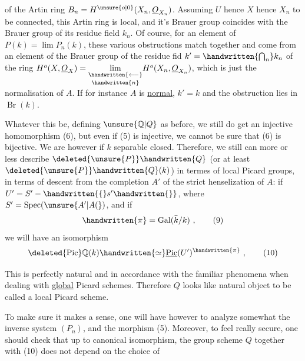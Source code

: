 of the Artin ring $B_n=H^{\unsure{o|0}}(X_n,\underline{O}_{X_n})$. Assuming $U$ hence $X$ hence $X_n$ to be connected, this Artin ring is local, and it's Brauer group coincides with the Brauer group of its residue field $k_n$. Of course,  for an element of $P(k)=\lim P_n(k)$, these various obstructions match together and come from an element of the Brauer group of the residue fid $k'=\handwritten{\bigcap_n}k_n$ of the ring $H^o(X,\underline{O}_X)=\underset{\handwritten{n}}{\underset{\handwritten{\longleftarrow}}{\lim}}H^o(X_n,\underline{O}_{X_n})$,  which is just the normalisation of $A$. If for instance $A$ is \uline{normal},  $k'=k$ and the obstruction lies in $\operatorname{Br}(k)$.

Whatever this be, defining $\unsure{\mathbb{Q}|Q}$ as before, we still do get an injective homomorphism (6), but even if (5) is injective, we cannot be sure that (6) is bijective. We are however if $k$  separable closed. Therefore, we still  can more or less describe $\deleted{\unsure{P}}\handwritten{Q}$ (or at least $\deleted{\unsure{P}}\handwritten{Q}(k)$) in termes of local Picard groups, in terms of  descent from the completion $A'$ of the strict henselization of $A$: if $U'=S'-\handwritten{\{}s'\handwritten{\}}$, where $S'=\operatorname{Spec}(\unsure{A'|A(})$, and if
\[
\handwritten{\pi}=\operatorname{Gal}(\bar{k}/k)\ ,
\tag*{(9)}
\]
we will have an isomorphism
\[
\deleted{\operatorname{Pic}}\mathbb{Q}(k)\handwritten{\simeq}\underline{\operatorname{Pic}}(U')^{\handwritten{\pi}}\ ,
\tag*{(10)}
\]

This is perfectly natural and in accordance with the familiar phenomena when dealing with \uline{global} Picard schemes. Therefore $Q$ looks like  natural object to be called a  local Picard scheme.

To make sure it makes a sense, one will have however to analyze somewhat the inverse system $(P_n)$, and the morphism (5). Moreover, to feel really secure, one should check that up to canonical isomorphism, the group scheme $Q$ together with (10) does not depend on the choice of
